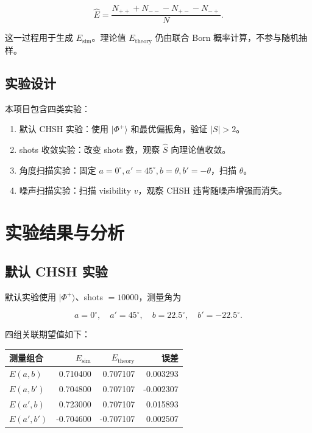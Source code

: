 \documentclass{zjureport}
\begin{document}
\[
\hat{E}
=\frac{N_{++}+N_{--}-N_{+-}-N_{-+}}{N}.
\]

这一过程用于生成 \(E_{\mathrm{sim}}\)。理论值 \(E_{\mathrm{theory}}\) 仍由联合 Born 概率计算，不参与随机抽样。

\subsection{实验设计}\label{ux5b9eux9a8cux8bbeux8ba1}

本项目包含四类实验：

\begin{enumerate}
\def\labelenumi{\arabic{enumi}.}
\item
  默认 CHSH 实验：使用 \(|\Phi^+\rangle\) 和最优偏振角，验证 \(|S|>2\)。
\item
  shots 收敛实验：改变 shots 数，观察 \(\hat{S}\) 向理论值收敛。
\item
  角度扫描实验：固定 \(a=0^\circ,a'=45^\circ,b=\theta,b'=-\theta\)，扫描 \(\theta\)。
\item
  噪声扫描实验：扫描 visibility \(v\)，观察 CHSH 违背随噪声增强而消失。
\end{enumerate}

\clearpage

\section{实验结果与分析}\label{ux5b9eux9a8cux7ed3ux679cux4e0eux5206ux6790}

\subsection{默认 CHSH 实验}\label{ux9ed8ux8ba4-chsh-ux5b9eux9a8c}

默认实验使用 \(|\Phi^+\rangle\)、shots \(=10000\)，测量角为

\[
a=0^\circ,\quad a'=45^\circ,\quad b=22.5^\circ,\quad b'=-22.5^\circ.
\]

四组关联期望值如下：

\begin{longtable}[]{@{}lrrr@{}}
\toprule\noalign{}
测量组合 & \(E_{\mathrm{sim}}\) & \(E_{\mathrm{theory}}\) & 误差 \\
\midrule\noalign{}
\endhead
\bottomrule\noalign{}
\endlastfoot
\(E(a,b)\) & 0.710400 & 0.707107 & 0.003293 \\
\(E(a,b')\) & 0.704800 & 0.707107 & -0.002307 \\
\(E(a',b)\) & 0.723000 & 0.707107 & 0.015893 \\
\(E(a',b')\) & -0.704600 & -0.707107 & 0.002507 \\
\end{longtable}
\end{document}
